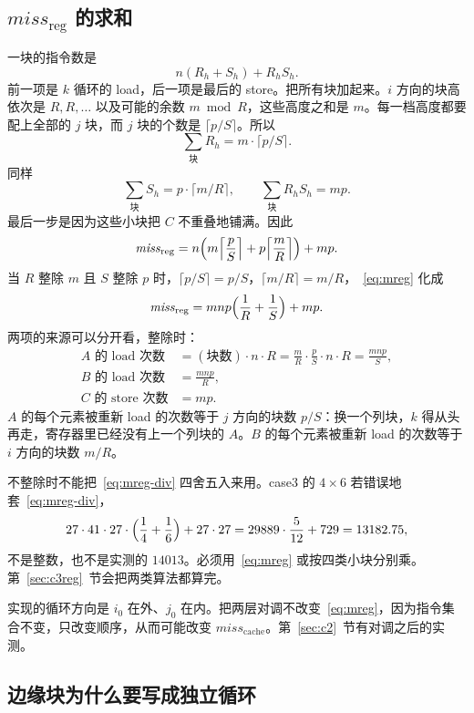 \documentclass[11pt,a4paper,fontset=fandol]{ctexart}
\newcommand{\mreg}{\mathit{miss}_{\mathrm{reg}}}
\newcommand{\mc}{\mathit{miss}_{\mathrm{cache}}}
\begin{document}
\subsection{\texorpdfstring{$\mreg$}{miss\_reg} 的求和}

一块的指令数是
\[
n(R_h+S_h)+R_h S_h.
\]
前一项是 $k$ 循环的 load，后一项是最后的 store。把所有块加起来。$i$ 方向的块高依次是 $R,R,\ldots$ 以及可能的余数 $m\bmod R$，这些高度之和是 $m$。每一档高度都要配上全部的 $j$ 块，而 $j$ 块的个数是 $\lceil p/S\rceil$。所以
\[
\sum_{\text{块}} R_h = m\cdot\lceil p/S\rceil.
\]
同样
\[
\sum_{\text{块}} S_h = p\cdot\lceil m/R\rceil,\qquad
\sum_{\text{块}} R_h S_h = mp.
\]
最后一步是因为这些小块把 $C$ 不重叠地铺满。因此
\begin{equation}
\label{eq:mreg}
\mreg
=n\Bigl(m\Bigl\lceil\frac{p}{S}\Bigr\rceil+p\Bigl\lceil\frac{m}{R}\Bigr\rceil\Bigr)+mp.
\end{equation}
当 $R$ 整除 $m$ 且 $S$ 整除 $p$ 时，$\lceil p/S\rceil=p/S$，$\lceil m/R\rceil=m/R$，~\eqref{eq:mreg} 化成
\begin{equation}
\label{eq:mreg-div}
\mreg=mnp\Bigl(\frac1R+\frac1S\Bigr)+mp.
\end{equation}
两项的来源可以分开看，整除时：
\begin{align*}
A\text{ 的 load 次数}
&=(\text{块数})\cdot n\cdot R
=\frac{m}{R}\cdot\frac{p}{S}\cdot n\cdot R
=\frac{mnp}{S},\\[0.3em]
B\text{ 的 load 次数}
&=\frac{mnp}{R},\\[0.3em]
C\text{ 的 store 次数}
&=mp.
\end{align*}
$A$ 的每个元素被重新 load 的次数等于 $j$ 方向的块数 $p/S$：换一个列块，$k$ 得从头再走，寄存器里已经没有上一个列块的 $A$。$B$ 的每个元素被重新 load 的次数等于 $i$ 方向的块数 $m/R$。

不整除时不能把~\eqref{eq:mreg-div} 四舍五入来用。case3 的 $4\times6$ 若错误地套~\eqref{eq:mreg-div}，
\[
27\cdot41\cdot27\cdot\Bigl(\frac14+\frac16\Bigr)+27\cdot27
=29889\cdot\frac{5}{12}+729=13182.75,
\]
不是整数，也不是实测的 $14013$。必须用~\eqref{eq:mreg} 或按四类小块分别乘。第~\ref{sec:c3reg}~节会把两类算法都算完。

实现的循环方向是 $i_0$ 在外、$j_0$ 在内。把两层对调不改变~\eqref{eq:mreg}，因为指令集合不变，只改变顺序，从而可能改变 $\mc$。第~\ref{sec:c2}~节有对调之后的实测。

\subsection{边缘块为什么要写成独立循环}
\end{document}
